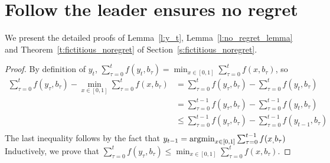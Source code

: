 \section{Follow the leader ensures no regret}\label{app:s:fictitious_noregret}
We present the detailed proofs of Lemma~\ref{l:y_t}, Lemma~\ref{l:no_regret_lemma} and
Theorem~\ref{t:fictitious_noregret} of Section~\ref{s:fictitious_noregret}.
\begin{proof}By definition of $y_t$,
  $\sum_{\tau=0}^t f(y_t,b_\tau)=\min_{ x \in [0,1]} \sum_{\tau=0}^t f(x,b_\tau)$, so
  \begin{align*}
    \sum_{\tau=0}^t f(y_\tau,b_\tau) - \min_{ x \in [0,1]} \sum_{\tau=0}^t f(x,b_\tau) &=
    \sum_{\tau=0}^t f(y_\tau,b_\tau) - \sum_{\tau=0}^t f(y_t,b_\tau)\\
    &= \sum_{\tau=0}^{t-1} f(y_\tau,b_\tau) - \sum_{\tau=0}^{t-1} f(y_t,b_\tau)\\
    &\leq \sum_{\tau=0}^{t-1} f(y_\tau,b_\tau) - \sum_{\tau=0}^{t-1} f(y_{t-1},b_\tau)\\
  \end{align*}
  The last inequality follows by the fact that $y_{t-1} = \operatorname*{argmin}_{x \in [0,1]}\sum_{\tau=0}^{t-1}f(x_,b_\tau)$
  Inductively, we prove that $\sum_{\tau=0}^t f(y_\tau,b_\tau) \leq \min_{ x \in [0,1]} \sum_{\tau=0}^t f(x,b_\tau)$.
\end{proof}

